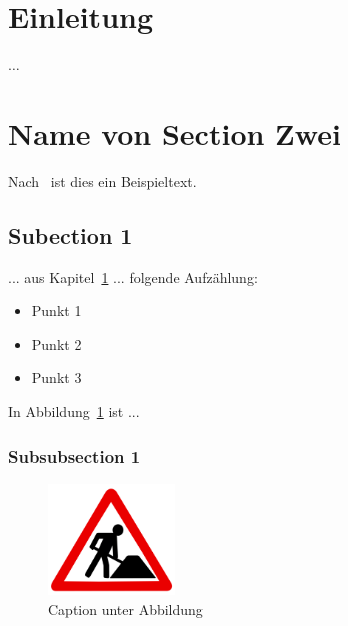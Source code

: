 \documentclass{article}
\begin{document}
\newpage
\lstlistoflistings
{}


\newpage

\cleardoublepage


\section{Einleitung}
\label{sec:section_1}

$\ldots$

\section{Name von Section Zwei}
\label{sec:section_2}

Nach~\cite{example_ref} ist dies ein Beispieltext.


\subsection{Subection 1}
\label{subsec:label_fuer_referenz_unterkapitel}

... aus Kapitel~\ref{sec:section_1} ... folgende Aufzählung:

\begin{itemize}
\setlength{\itemsep}{0pt}
    \item Punkt 1
    \item Punkt 2
    \item Punkt 3
\end{itemize}

In Abbildung~\ref{fig:example_figure} ist ...

\subsubsection{Subsubsection 1}
\label{subsubsec:label_abschnitt}

\begin{figure}[h] 
	\centering
	\includegraphics[width=0.3\textwidth]{baustelle.jpg}
	\caption[Caption für Abbildungsverzeichnis]{Caption unter Abbildung}
	\label{fig:example_figure}
\end{figure}
\end{document}

